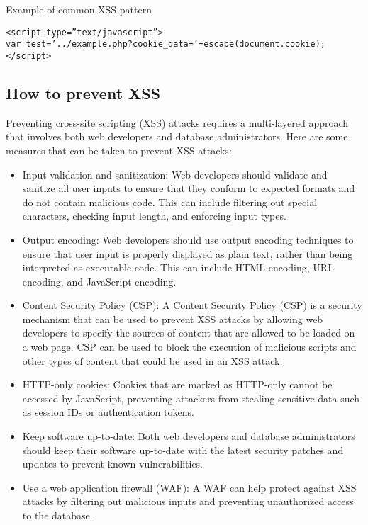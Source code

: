 \documentclass[11pt]{article}
\begin{document}
Example of common XSS pattern\\

\begin{verbatim}
<script type=”text/javascript”>
var test=’../example.php?cookie_data=’+escape(document.cookie);
</script>
\end{verbatim}

\subsection{How to prevent XSS}
\label{sec:org9c4fded}

Preventing cross-site scripting (XSS) attacks requires a multi-layered approach that involves both web developers and database administrators. Here are some measures that can be taken to prevent XSS attacks:\\

\begin{itemize}
\item Input validation and sanitization: Web developers should validate and sanitize all user inputs to ensure that they conform to expected formats and do not contain malicious code. This can include filtering out special characters, checking input length, and enforcing input types.\\

\item Output encoding: Web developers should use output encoding techniques to ensure that user input is properly displayed as plain text, rather than being interpreted as executable code. This can include HTML encoding, URL encoding, and JavaScript encoding.\\

\item Content Security Policy (CSP): A Content Security Policy (CSP) is a security mechanism that can be used to prevent XSS attacks by allowing web developers to specify the sources of content that are allowed to be loaded on a web page. CSP can be used to block the execution of malicious scripts and other types of content that could be used in an XSS attack.\\

\item HTTP-only cookies: Cookies that are marked as HTTP-only cannot be accessed by JavaScript, preventing attackers from stealing sensitive data such as session IDs or authentication tokens.\\

\item Keep software up-to-date: Both web developers and database administrators should keep their software up-to-date with the latest security patches and updates to prevent known vulnerabilities.\\

\item Use a web application firewall (WAF): A WAF can help protect against XSS attacks by filtering out malicious inputs and preventing unauthorized access to the database.\\
\end{itemize}
\end{document}
